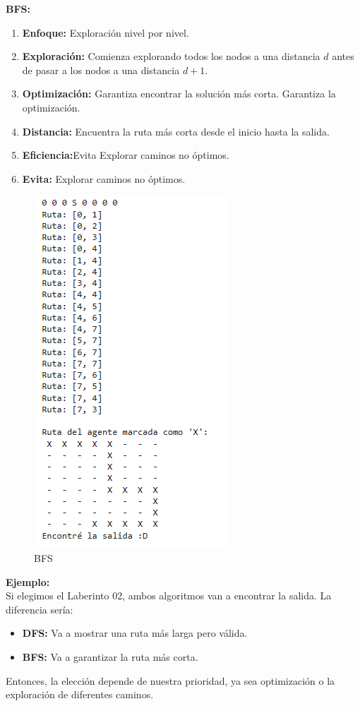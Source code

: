 {\large\textbf{BFS:}}

\begin{enumerate}
    \item \textbf{Enfoque:} Exploración nivel por nivel.
    \item \textbf{Exploración:} Comienza explorando todos los nodos a una 
    distancia \(d\) antes de pasar a los nodos a una distancia \(d+1\).
    \item \textbf{Optimización:} Garantiza encontrar la solución más corta. Garantiza la optimización.
    \item \textbf{Distancia:} Encuentra la ruta más corta desde el inicio hasta la salida.
    \item \textbf{Eficiencia:}Evita Explorar caminos no óptimos.
    \item \textbf{Evita:} Explorar caminos no óptimos.
\end{enumerate}

\begin{figure}[h]
    \centering
    \includegraphics[scale = .4]{IMA/BFS.png}
    \caption{BFS}
    \label{fig:enter-label}
\end{figure}
\vspace{0.5cm}

\textbf{Ejemplo:}\\

Si elegimos el Laberinto 02, ambos algoritmos van a encontrar la salida. La diferencia sería:

\begin{itemize}
    \item \textbf{DFS:} Va a mostrar una ruta más larga pero válida.
    \item \textbf{BFS:} Va a garantizar la ruta más corta.
\end{itemize}

Entonces, la elección depende de nuestra prioridad, ya sea optimización o la exploración 
de diferentes caminos.